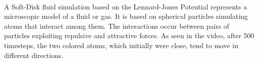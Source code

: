 \documentclass[11pt]{article}
\begin{document}
    \begin{center}
    \end{center}
    { \hspace*{\fill} \\}
    
    A Soft-Disk fluid simulation based on the Lennard-Jones Potential
represents a microscopic model of a fluid or gas. It is based on
spherical particles simulating atoms that interact among them. The
interactions occur between pairs of particles exploiting repulsive and
attractive forces. As seen in the video, after 500 timesteps, the two
colored atoms, which initially were close, tend to move in different
directions.


    
    
    
\end{document}

